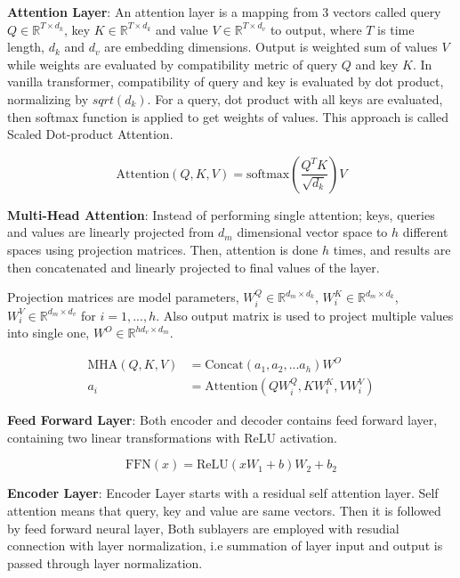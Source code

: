 \textbf{Attention Layer}: An attention layer is a mapping from 3 vectors called query $Q \in \mathbb{R}^{T \times d_k}$, key $K \in \mathbb{R}^{T \times d_k}$ and value $V \in \mathbb{R}^{T \times d_v}$ to output, where $T$ is time length, $d_k$ and $d_v$ are embedding dimensions. Output is weighted sum of values $V$ while weights are evaluated by compatibility metric of query $Q$ and key $K$. In vanilla transformer, compatibility of query and key is evaluated by dot product, normalizing by $sqrt(d_k)$. For a query, dot product with all keys are evaluated, then softmax function is applied to get weights of values. This approach is called Scaled Dot-product Attention.

\begin{equation}
\mathrm{Attention}(Q, K, V) = \mathrm{softmax}(\frac{Q^{T} K}{\sqrt{d_k}}) V
\end{equation}

\textbf{Multi-Head Attention}: Instead of performing single attention; keys, queries and values are linearly projected from $d_m$ dimensional vector space to $h$ different spaces using projection matrices. Then, attention is done $h$ times, and results are then concatenated and linearly projected to final values of the layer.

Projection matrices are model parameters, $W^Q_i \in \mathbb{R}^{d_m \times d_k}$, $W^K_i \in \mathbb{R}^{d_m \times d_k}$, $W^V_i \in \mathbb{R}^{d_m \times d_v}$ for $i=1,...,h$. Also output matrix is used to project multiple values into single one, $W^O \in \mathbb{R}^{h d_v \times d_m}$.

\begin{equation}
\begin{split}
\mathrm{MHA}(Q,K,V) &=  \text{Concat}(a_1, a_2, ... a_h)W^O \\
a_i &=  \text{Attention}(QW^Q_i,KW^K_i,VW^V_i)
\end{split}
\end{equation}

\textbf{Feed Forward Layer}: Both encoder and decoder contains feed forward layer, containing two linear transformations with ReLU activation.

\begin{equation}
\mathrm{FFN}(x) = \text{ReLU}(xW_1+b)W_2+b_2
\end{equation}



\textbf{Encoder Layer}: Encoder Layer starts with a residual self attention layer. Self attention means that query, key and value are same vectors. Then it is followed by feed forward neural layer, Both sublayers are employed with resudial connection with layer normalization, i.e summation of layer input and output is passed through layer normalization.

